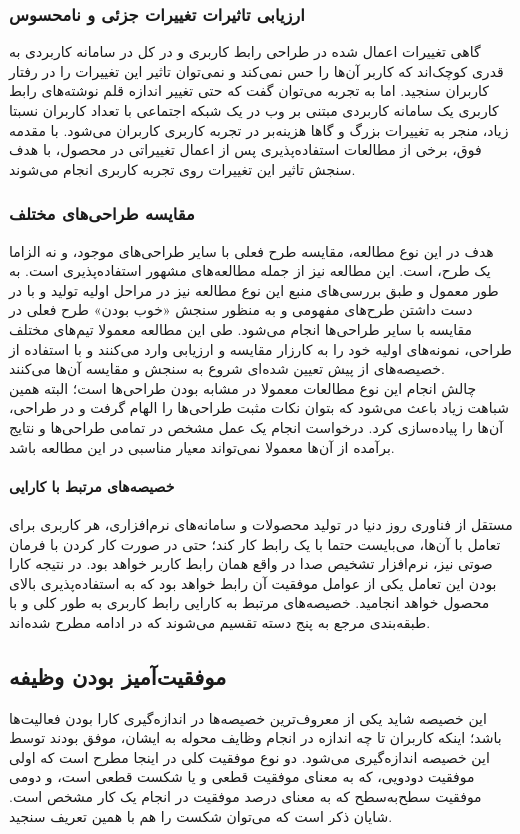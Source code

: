 \subsubsection{ارزیابی تاثیرات تغییرات جزئی و نامحسوس}
گاهی تغییرات اعمال شده در طراحی رابط  کاربری و در کل در سامانه کاربردی به قدری کوچک‌اند که کاربر آن‌ها را حس نمی‌کند و نمی‌توان تاثیر این تغییرات را در رفتار کاربران سنجید. اما به تجربه
\cite{albert_measuring_2013}
می‌توان گفت که حتی تغییر اندازه قلم نوشته‌های رابط کاربری یک سامانه کاربردی مبتنی بر وب در یک شبکه اجتماعی با تعداد کاربران نسبتا زیاد، منجر به تغییرات  بزرگ و گاها هزینه‌بر در تجربه کاربری کاربران می‌شود. با مقدمه فوق، برخی از مطالعات استفاده‌پذیری پس از اعمال تغییراتی در محصول، با هدف سنجش تاثیر این تغییرات روی تجربه کاربری انجام می‌شوند.
\subsubsection{مقایسه طراحی‌های مختلف}
هدف در این نوع مطالعه، مقایسه طرح فعلی با سایر طراحی‌های موجود، و نه الزاما یک طرح، است. این مطالعه نیز از جمله مطالعه‌های مشهور استفاده‌پذیری است. به طور معمول و طبق بررسی‌های منبع
\cite{albert_measuring_2013}
این نوع مطالعه نیز در مراحل اولیه تولید و با در دست داشتن طرح‌های مفهومی و به منظور سنجش «خوب بودن» طرح فعلی در مقایسه با سایر طراحی‌ها انجام می‌شود. طی این مطالعه معمولا تیم‌های مختلف طراحی، نمونه‌های اولیه
خود را به کارزار مقایسه و ارزیابی وارد می‌کنند و با استفاده از خصیصه‌های از پیش تعیین شده‌ای شروع به سنجش و مقایسه آن‌ها می‌کنند.\\
چالش انجام این نوع مطالعات معمولا در مشابه بودن طراحی‌ها است؛ البته همین شباهت زیاد باعث می‌شود که بتوان نکات مثبت طراحی‌ها را الهام گرفت و در طراحی، آن‌ها را پیاده‌سازی کرد. درخواست انجام یک عمل مشخص در تمامی طراحی‌ها و نتایج برآمده از آن‌ها معمولا نمی‌تواند معیار مناسبی در این مطالعه باشد.
\paragraph{خصیصه‌های مرتبط با کارایی}
مستقل از فناوری روز دنیا در تولید محصولات و سامانه‌های نرم‌افزاری، هر کاربری برای تعامل با آن‌ها، می‌بایست حتما با یک رابط کار کند؛ حتی در صورت کار کردن با فرمان صوتی نیز، نرم‌افزار تشخیص صدا در واقع همان رابط کاربر خواهد بود. در نتیجه کارا بودن این تعامل یکی از عوامل موفقیت آن رابط خواهد بود که به استفاده‌پذیری بالای محصول خواهد انجامید. خصیصه‌های مرتبط به کارایی رابط کاربری به طور کلی و با طبقه‌بندی مرجع
\cite{albert_measuring_2013}
به پنج دسته تقسیم می‌شوند که در ادامه مطرح شده‌اند.
\subsection{موفقیت‌آمیز بودن وظیفه}
این خصیصه شاید یکی از معروف‌ترین خصیصه‌ها در اندازه‌گیری کارا بودن فعالیت‌ها باشد؛ اینکه کاربران تا چه اندازه در انجام وظایف محوله به ایشان، موفق بودند توسط این خصیصه اندازه‌گیری می‌شود. دو نوع موفقیت کلی در اینجا مطرح است که اولی موفقیت دودویی، که به معنای موفقیت قطعی و یا شکست قطعی است، و دومی موفقیت سطح‌به‌سطح که به معنای درصد موفقیت در انجام یک کار مشخص است. شایان ذکر است که می‌توان شکست را هم با همین تعریف سنجید.
